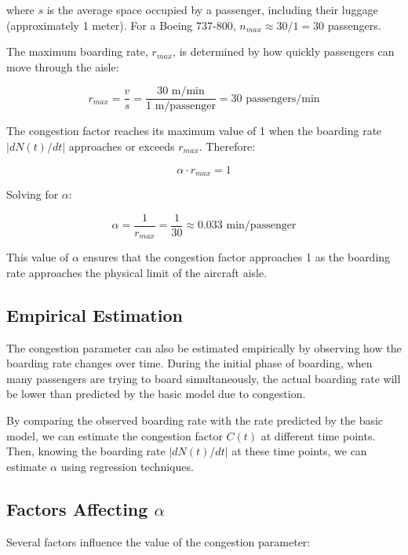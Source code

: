 \documentclass[12pt,a4paper]{article}
\begin{document}
where $s$ is the average space occupied by a passenger, including their luggage (approximately 1 meter). For a Boeing 737-800, $n_{max} \approx 30 / 1 = 30$ passengers.

The maximum boarding rate, $r_{max}$, is determined by how quickly passengers can move through the aisle:

\begin{equation}
r_{max} = \frac{v}{s} = \frac{30 \text{ m/min}}{1 \text{ m/passenger}} = 30 \text{ passengers/min}
\end{equation}

The congestion factor reaches its maximum value of 1 when the boarding rate $|dN(t)/dt|$ approaches or exceeds $r_{max}$. Therefore:

\begin{equation}
\alpha \cdot r_{max} = 1
\end{equation}

Solving for $\alpha$:

\begin{equation}
\alpha = \frac{1}{r_{max}} = \frac{1}{30} \approx 0.033 \text{ min/passenger}
\end{equation}

This value of $\alpha$ ensures that the congestion factor approaches 1 as the boarding rate approaches the physical limit of the aircraft aisle.

\subsection{Empirical Estimation}

The congestion parameter can also be estimated empirically by observing how the boarding rate changes over time. During the initial phase of boarding, when many passengers are trying to board simultaneously, the actual boarding rate will be lower than predicted by the basic model due to congestion.

By comparing the observed boarding rate with the rate predicted by the basic model, we can estimate the congestion factor $C(t)$ at different time points. Then, knowing the boarding rate $|dN(t)/dt|$ at these time points, we can estimate $\alpha$ using regression techniques.

\subsection{Factors Affecting $\alpha$}

Several factors influence the value of the congestion parameter:
\end{document}
